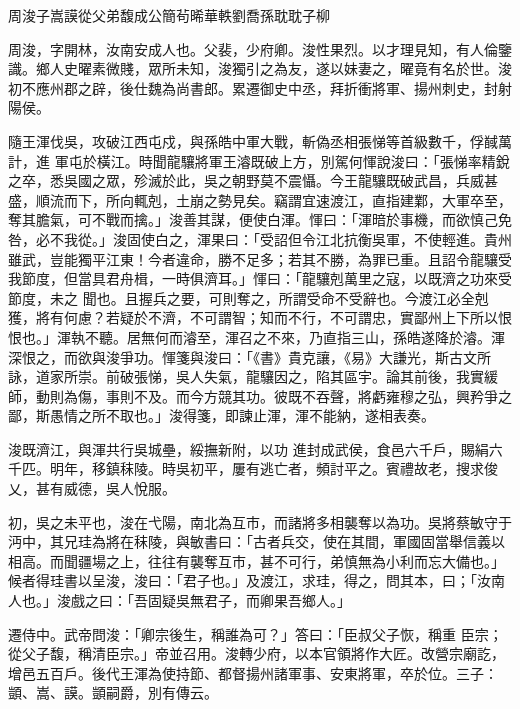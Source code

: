 
\begin{pinyinscope}

 周浚子嵩謨從父弟馥成公簡茍晞華軼劉喬孫耽耽子柳



 周浚，字開林，汝南安成人也。父裴，少府卿。浚性果烈。以才理見知，有人倫鑒識。鄉人史曜素微賤，眾所未知，浚獨引之為友，遂以妹妻之，曜竟有名於世。浚初不應州郡之辟，後仕魏為尚書郎。累遷御史中丞，拜折衝將軍、揚州刺史，封射陽侯。



 隨王渾伐吳，攻破江西屯戍，與孫皓中軍大戰，斬偽丞相張悌等首級數千，俘馘萬計，進
 軍屯於橫江。時聞龍驤將軍王濬既破上方，別駕何惲說浚曰：「張悌率精銳之卒，悉吳國之眾，殄滅於此，吳之朝野莫不震懾。今王龍驤既破武昌，兵威甚盛，順流而下，所向輒剋，土崩之勢見矣。竊謂宜速渡江，直指建鄴，大軍卒至，奪其膽氣，可不戰而擒。」浚善其謀，便使白渾。惲曰：「渾暗於事機，而欲慎己免咎，必不我從。」浚固使白之，渾果曰：「受詔但令江北抗衡吳軍，不使輕進。貴州雖武，豈能獨平江東！今者違命，勝不足多；若其不勝，為罪已重。且詔令龍驤受我節度，但當具君舟楫，一時俱濟耳。」惲曰：「龍驤剋萬里之寇，以既濟之功來受節度，未之
 聞也。且握兵之要，可則奪之，所謂受命不受辭也。今渡江必全剋獲，將有何慮？若疑於不濟，不可謂智；知而不行，不可謂忠，實鄙州上下所以恨恨也。」渾執不聽。居無何而濬至，渾召之不來，乃直指三山，孫皓遂降於濬。渾深恨之，而欲與浚爭功。惲箋與浚曰：「《書》貴克讓，《易》大謙光，斯古文所詠，道家所崇。前破張悌，吳人失氣，龍驤因之，陷其區宇。論其前後，我實緩師，動則為傷，事則不及。而今方競其功。彼既不吞聲，將虧雍穆之弘，興矜爭之鄙，斯愚情之所不取也。」浚得箋，即諫止渾，渾不能納，遂相表奏。



 浚既濟江，與渾共行吳城壘，綏撫新附，以功
 進封成武侯，食邑六千戶，賜絹六千匹。明年，移鎮秣陵。時吳初平，屢有逃亡者，頻討平之。賓禮故老，搜求俊乂，甚有威德，吳人悅服。



 初，吳之未平也，浚在弋陽，南北為互市，而諸將多相襲奪以為功。吳將蔡敏守于沔中，其兄珪為將在秣陵，與敏書曰：「古者兵交，使在其間，軍國固當舉信義以相高。而聞疆場之上，往往有襲奪互市，甚不可行，弟慎無為小利而忘大備也。」候者得珪書以呈浚，浚曰：「君子也。」及渡江，求珪，得之，問其本，曰；「汝南人也。」浚戲之曰：「吾固疑吳無君子，而卿果吾鄉人。」



 遷侍中。武帝問浚：「卿宗後生，稱誰為可？」答曰：「臣叔父子恢，稱重
 臣宗；從父子馥，稱清臣宗。」帝並召用。浚轉少府，以本官領將作大匠。改營宗廟訖，增邑五百戶。後代王渾為使持節、都督揚州諸軍事、安東將軍，卒於位。三子：顗、嵩、謨。顗嗣爵，別有傳云。




\end{pinyinscope}
